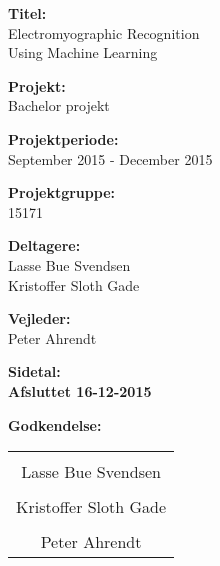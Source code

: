 \begin{minipage}[t]{0.68\textwidth}
\textbf{Titel:} \\[5pt]\hspace*{2ex}
Electromyographic Recognition\\\hspace*{2ex}
Using Machine Learning\\\hspace*{2ex}

\textbf{Projekt:} \\[5pt]\bigskip\hspace{2ex}
Bachelor projekt

\textbf{Projektperiode:} \\[5pt]\bigskip\hspace{2ex}
September 2015 - December 2015

\textbf{Projektgruppe:} \\[5pt]\bigskip\hspace{2ex}
15171

\textbf{Deltagere:} \\[5pt]\hspace*{2ex}
Lasse Bue Svendsen\\\hspace*{2ex}
Kristoffer Sloth Gade \\\hspace*{2ex}


\textbf{Vejleder:} \\[5pt]\hspace*{2ex}
Peter Ahrendt \\\bigskip\hspace{2ex}

\vspace*{4cm}

\textbf{Sidetal: \pageref{SidsteSide}} \\
\textbf{Afsluttet 16-12-2015}

\end{minipage}
\hfill
\begin{minipage}[t]{0.483\textwidth}
	\textbf{Godkendelse:}\vspace{2cm}
	
\begin{tabular}{c}
	\underline{\phantom{mmmmmmmmmmmmmm}}  \\
	Lasse Bue Svendsen \vspace{2cm}\\
	\underline{\phantom{mmmmmmmmmmmmmm}} \\
	Kristoffer Sloth Gade \vspace{2cm}	\\
	\underline{\phantom{mmmmmmmmmmmmmm}} \\
	Peter Ahrendt \vspace{2cm}	\\
\end{tabular}

\end{minipage}

\vfill